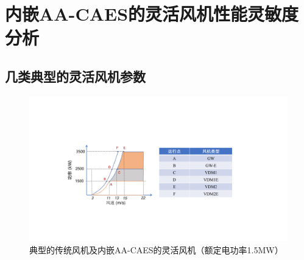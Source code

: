 \chapter{内嵌AA-CAES的灵活风机性能灵敏度分析}
\label{cha:ca-wt-para-sensitivity}

\section{几类典型的灵活风机参数}
\begin{figure}[H] %
  \centering
  \includegraphics[scale=0.55]{figures/Chap5-CA-WT-Category.pdf}
  \caption{典型的传统风机及内嵌AA-CAES的灵活风机（额定电功率1.5MW）}
  \label{fig:CA-WT-Category}
\end{figure}

